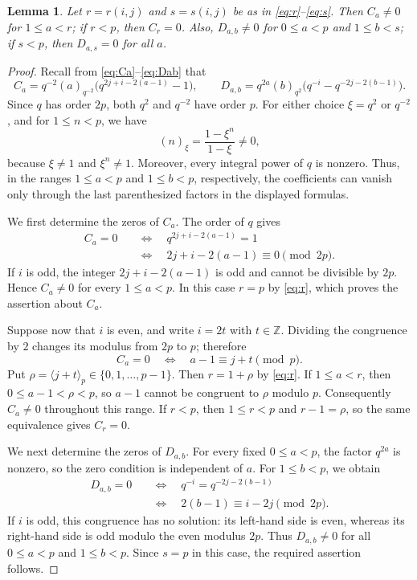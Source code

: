 \documentclass[10pt,oneside]{amsart}
\newcommand{\res}[1]{\langle #1\rangle_p}
\newtheorem{lemma}[proposition]{Lemma}
\theoremstyle{definition}
\begin{document}
\begin{lemma}\label{lem:firstzero}
Let $r=r(i,j)$ and $s=s(i,j)$ be as in \eqref{eq:r}--\eqref{eq:s}. Then $C_a\ne0$ for $1\le a<r$; if $r<p$, then $C_r=0$. Also, $D_{a,b}\ne0$ for $0\le a<p$ and $1\le b<s$; if $s<p$, then $D_{a,s}=0$ for all $a$.
\end{lemma}
\begin{proof}
Recall from \eqref{eq:Ca}--\eqref{eq:Dab} that
\[
 C_a=q^{-2}(a)_{q^{-2}}
       \bigl(q^{2j+i-2(a-1)}-1\bigr),\qquad
 D_{a,b}=q^{2a}(b)_{q^2}
       \bigl(q^{-i}-q^{-2j-2(b-1)}\bigr).
\]
Since $q$ has order $2p$, both $q^2$ and $q^{-2}$ have order $p$.
For either choice $\xi=q^2$ or $q^{-2}$, and for $1\le n<p$, we have
\[
 (n)_\xi=\frac{1-\xi^n}{1-\xi}\ne0,
\]
because $\xi\ne1$ and $\xi^n\ne1$. Moreover, every integral power of
$q$ is nonzero. Thus, in the ranges $1\le a<p$ and $1\le b<p$,
respectively, the coefficients can vanish only through the last
parenthesized factors in the displayed formulas.

We first determine the zeros of $C_a$. The order of $q$ gives
\begin{align*}
 C_a=0
 &\quad\Longleftrightarrow\quad q^{2j+i-2(a-1)}=1\\
 &\quad\Longleftrightarrow\quad
       2j+i-2(a-1)\equiv0\pmod{2p}.
\end{align*}
If $i$ is odd, the integer $2j+i-2(a-1)$ is odd and cannot be
divisible by $2p$. Hence $C_a\ne0$ for every $1\le a<p$.
In this case $r=p$ by \eqref{eq:r}, which proves the assertion about
$C_a$.

Suppose now that $i$ is even, and write $i=2t$ with $t\in\mathbb Z$.
Dividing the congruence by $2$ changes its modulus from $2p$ to $p$;
therefore
\[
 C_a=0\quad\Longleftrightarrow\quad
 a-1\equiv j+t\pmod p.
\]
Put $\rho=\res{j+t}\in\{0,1,\ldots,p-1\}$. Then
$r=1+\rho$ by \eqref{eq:r}. If $1\le a<r$, then
$0\le a-1<\rho<p$, so $a-1$ cannot be congruent to $\rho$ modulo $p$.
Consequently $C_a\ne0$ throughout this range. If $r<p$, then
$1\le r<p$ and $r-1=\rho$, so the same equivalence gives $C_r=0$.


We next determine the zeros of $D_{a,b}$. For every fixed
$0\le a<p$, the factor $q^{2a}$ is nonzero, so the zero condition
is independent of $a$. For $1\le b<p$, we obtain
\begin{align*}
 D_{a,b}=0
 &\quad\Longleftrightarrow\quad
       q^{-i}=q^{-2j-2(b-1)}\\
 &\quad\Longleftrightarrow\quad
       2(b-1)\equiv i-2j\pmod{2p}.
\end{align*}
If $i$ is odd, this congruence has no solution: its left-hand side
is even, whereas its right-hand side is odd modulo the even
modulus $2p$. Thus $D_{a,b}\ne0$ for all $0\le a<p$ and
$1\le b<p$. Since $s=p$ in this case, the required assertion follows.


\end{proof}
\end{document}
